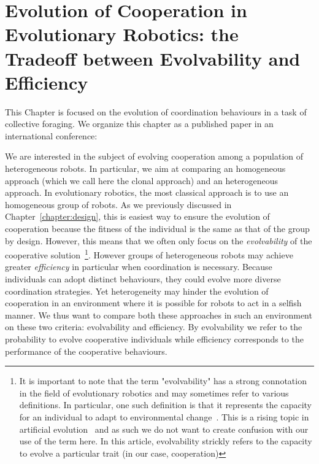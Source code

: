 \chapter{Evolution of Cooperation in Evolutionary Robotics: the Tradeoff between Evolvability and Efficiency}
\label{chapter:C2_article1}

\setcounter{minitocdepth}{1}
\minitoc[n] %

This Chapter is focused on the evolution of coordination behaviours in a task of collective foraging. We organize this chapter as a published paper in an international conference:

\begin{quote}
\end{quote}


We are interested in the subject of evolving cooperation among a population of heterogeneous robots. In particular, we aim at comparing an homogeneous approach (which we call here the clonal approach) and an heterogeneous approach. In evolutionary robotics, the most classical approach is to use an homogeneous group of robots. As we previously discussed in Chapter~\ref{chapter:design}, this is easiest way to ensure the evolution of cooperation because the fitness of the individual is the same as that of the group by design. However, this means that we often only focus on the \emph{evolvability} of the cooperative solution~\footnote{It is important to note that the term "evolvability" has a strong connotation in the field of evolutionary robotics and may sometimes refer to various definitions. In particular, one such definition is that it represents the capacity for an individual to adapt to environmental change~\parencite{Wagner1996}. This is a rising topic in artificial evolution~\parencite{Banzhaf2006, Lehman2013, Doncieux2015a, Taylor2016} and as such we do not want to create confusion with our use of the term here. In this article, evolvability strickly refers to the capacity to evolve a particular trait (in our case, cooperation)}. However groups of heterogeneous robots may achieve greater \emph{efficiency} in particular when coordination is necessary. Because individuals can adopt distinct behaviours, they could evolve more diverse coordination strategies. Yet heterogeneity may hinder the evolution of cooperation in an environment where it is possible for robots to act in a selfish manner. We thus want to compare both these approaches in such an environment on these two criteria: evolvability and efficiency. By evolvability we refer to the probability to evolve cooperative individuals while efficiency corresponds to the performance of the cooperative behaviours.

